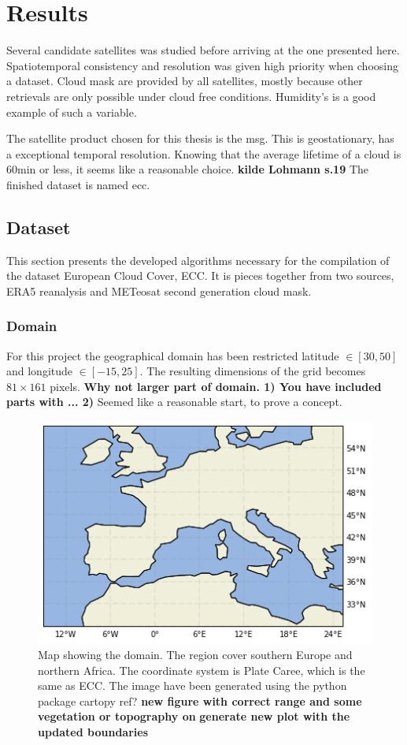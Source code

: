 \chapter{Results}
Several candidate satellites was studied before arriving at the one presented here. Spatiotemporal consistency and resolution was given high priority when choosing a dataset. Cloud mask are provided by all satellites, mostly because other retrievals are only possible under cloud free conditions. Humidity's is a good example of such a variable. 

The satellite product chosen for this thesis is the \acrfull{msg}. This is geostationary, has a exceptional temporal resolution. Knowing that the average lifetime of a cloud is 60min or less, it seems like a reasonable choice. \textbf{kilde Lohmann s.19} The finished dataset is named \acrfull{ecc}.

\section{Dataset}
This section presents the developed algorithms necessary for the compilation of the dataset European Cloud Cover, ECC. It is pieces together from two sources, ERA5 reanalysis and METeosat second generation cloud mask.

\subsection{Domain}
For this project the geographical domain has been restricted latitude $\in[30,50]$ and longitude $\in [-15, 25]$. The resulting dimensions of the grid becomes $81\times161$ pixels. \textbf{Why not larger part of domain. 1) You have included parts with ...  2) } Seemed like a reasonable start, to prove a concept. 

\begin{figure}[h]
    \centering
    \includegraphics[scale = 0.7]{Chapter2_Theory/images/Domain.png}
    \caption{Map showing the domain. The region cover southern Europe and northern Africa. The coordinate system is Plate Caree, which is the same as ECC. The image have been generated using the python package cartopy ref? \textbf{new figure with correct range and some vegetation or topography on  } \textbf{generate new plot with the updated boundaries}}
    \label{fig:map}
\end{figure}

